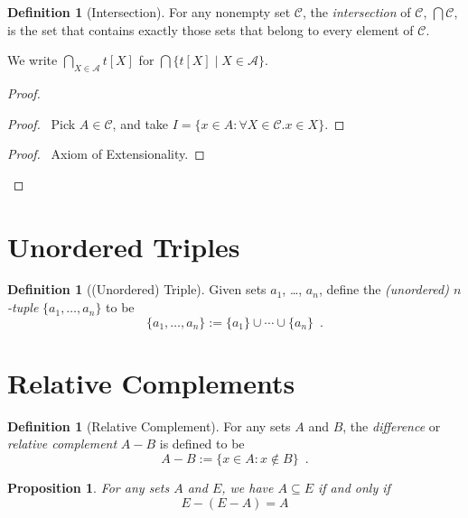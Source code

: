 \documentclass{report}
\let\qed\relax
\newtheorem{prop}[ax]{Proposition}
\theoremstyle{definition}
\newtheorem{df}[ax]{Definition}
\begin{document}
\begin{df}[Intersection]
For any nonempty set $\mathcal{C}$, the \emph{intersection} of $\mathcal{C}$, $\bigcap \mathcal{C}$, is the set that contains exactly those sets that belong to every element of $\mathcal{C}$.

We write $\bigcap_{X \in \mathcal{A}} t[X]$ for $\bigcap \{t[X] \mid X \in \mathcal{A} \}$.
\end{df}

\begin{proof}
\pf
{}
\begin{proof}
	\pf\ Pick $A \in \mathcal{C}$, and take $I = \{ x \in A : \forall X \in \mathcal{C}. x \in X \}$.
\end{proof}
\begin{proof}
	\pf\ Axiom of Extensionality.
\end{proof}
\qed
\end{proof}

\section{Unordered Triples}

\begin{df}[(Unordered) Triple]
Given sets $a_1$, \ldots, $a_n$, define the \emph{(unordered) $n$-tuple} $\{a_1, \ldots, a_n\}$ to be
\[ \{a_1, \ldots, a_n\} := \{a_1\} \cup \cdots \cup \{a_n\} \enspace . \]
\end{df}

\section{Relative Complements}

\begin{df}[Relative Complement]
For any sets $A$ and $B$, the \emph{difference} or \emph{relative complement} $A - B$ is defined to be
\[ A - B := \{ x \in A : x \notin B \} \enspace . \]
\end{df}

\begin{prop}
For any sets $A$ and $E$, we have $A \subseteq E$ if and only if
\[ E - (E - A) = A \]
\end{prop}
\end{document}
